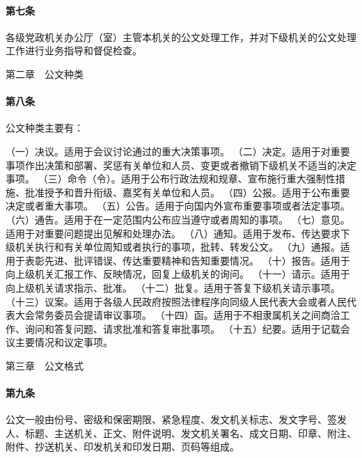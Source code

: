 \documentclass{gbt9704}
\begin{document}
\paragraph{第七条}
各级党政机关办公厅（室）主管本机关的公文处理工作，并对下级机关的公文处理工作进行业务指导和督促检查。


第二章　公文种类


\paragraph{第八条}
公文种类主要有：

（一）决议。适用于会议讨论通过的重大决策事项。
（二）决定。适用于对重要事项作出决策和部署、奖惩有关单位和人员、变更或者撤销下级机关不适当的决定事项。
（三）命令（令）。适用于公布行政法规和规章、宣布施行重大强制性措施、批准授予和晋升衔级、嘉奖有关单位和人员。
（四）公报。适用于公布重要决定或者重大事项。
（五）公告。适用于向国内外宣布重要事项或者法定事项。
（六）通告。适用于在一定范围内公布应当遵守或者周知的事项。
（七）意见。适用于对重要问题提出见解和处理办法。
（八）通知。适用于发布、传达要求下级机关执行和有关单位周知或者执行的事项，批转、转发公文。
（九）通报。适用于表彰先进、批评错误、传达重要精神和告知重要情况。
（十）报告。适用于向上级机关汇报工作、反映情况，回复上级机关的询问。
（十一）请示。适用于向上级机关请求指示、批准。
（十二）批复。适用于答复下级机关请示事项。
（十三）议案。适用于各级人民政府按照法律程序向同级人民代表大会或者人民代表大会常务委员会提请审议事项。
（十四）函。适用于不相隶属机关之间商洽工作、询问和答复问题、请求批准和答复审批事项。
（十五）纪要。适用于记载会议主要情况和议定事项。

第三章　公文格式


\paragraph{第九条}
公文一般由份号、密级和保密期限、紧急程度、发文机关标志、发文字号、签发人、标题、主送机关、正文、附件说明、发文机关署名、成文日期、印章、附注、附件、抄送机关、印发机关和印发日期、页码等组成。
\end{document}
